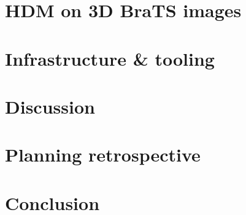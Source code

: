 \chapter{HDM on 3D BraTS images}


\chapter{Infrastructure \& tooling}


\chapter{Discussion}


\chapter{Planning retrospective}


\chapter{Conclusion}

